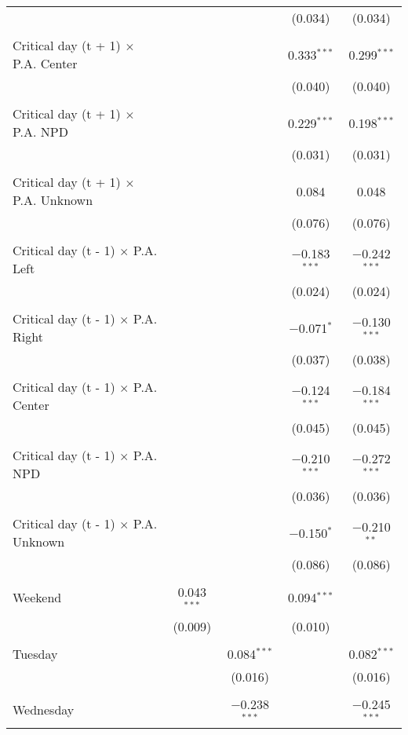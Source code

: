 \documentclass[
]{article}
\begin{document}
\begin{table}[!htbp]
{\begin{tabular}{@{\extracolsep{5pt}}lcccc}
  &  &  & (0.034) & (0.034) \\ 
  & & & & \\ 
 Critical day (t + 1) $\times$ P.A. Center &  &  & 0.333$^{***}$ & 0.299$^{***}$ \\ 
  &  &  & (0.040) & (0.040) \\ 
  & & & & \\ 
 Critical day (t + 1) $\times$ P.A. NPD &  &  & 0.229$^{***}$ & 0.198$^{***}$ \\ 
  &  &  & (0.031) & (0.031) \\ 
  & & & & \\ 
 Critical day (t + 1) $\times$ P.A. Unknown &  &  & 0.084 & 0.048 \\ 
  &  &  & (0.076) & (0.076) \\ 
  & & & & \\ 
 Critical day (t - 1) $\times$ P.A. Left &  &  & $-$0.183$^{***}$ & $-$0.242$^{***}$ \\ 
  &  &  & (0.024) & (0.024) \\ 
  & & & & \\ 
 Critical day (t - 1) $\times$ P.A. Right &  &  & $-$0.071$^{*}$ & $-$0.130$^{***}$ \\ 
  &  &  & (0.037) & (0.038) \\ 
  & & & & \\ 
 Critical day (t - 1) $\times$ P.A. Center &  &  & $-$0.124$^{***}$ & $-$0.184$^{***}$ \\ 
  &  &  & (0.045) & (0.045) \\ 
  & & & & \\ 
 Critical day (t - 1) $\times$ P.A. NPD &  &  & $-$0.210$^{***}$ & $-$0.272$^{***}$ \\ 
  &  &  & (0.036) & (0.036) \\ 
  & & & & \\ 
 Critical day (t - 1) $\times$ P.A. Unknown &  &  & $-$0.150$^{*}$ & $-$0.210$^{**}$ \\ 
  &  &  & (0.086) & (0.086) \\ 
  & & & & \\ 
 Weekend & 0.043$^{***}$ &  & 0.094$^{***}$ &  \\ 
  & (0.009) &  & (0.010) &  \\ 
  & & & & \\ 
 Tuesday &  & 0.084$^{***}$ &  & 0.082$^{***}$ \\ 
  &  & (0.016) &  & (0.016) \\ 
  & & & & \\ 
 Wednesday &  & $-$0.238$^{***}$ &  & $-$0.245$^{***}$ \\ 

\end{tabular}}
\end{table}
\end{document}
